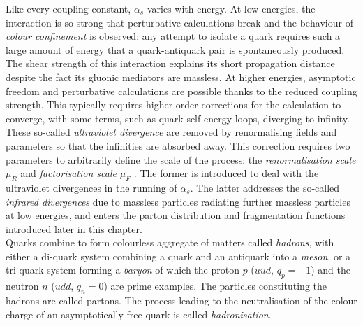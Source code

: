 Like every coupling constant, $\alpha_s$ varies with energy. At low energies, the interaction is so strong that perturbative calculations break and the behaviour of \textit{colour confinement} is observed: any attempt to isolate a quark requires such a large amount of energy that a quark-antiquark pair is spontaneously produced. The shear strength of this interaction explains its short propagation distance despite the fact its gluonic mediators are massless. At higher energies, asymptotic freedom and perturbative calculations are possible thanks to the reduced coupling strength. This typically requires higher-order corrections for the calculation to converge, with some terms, such as quark self-energy loops, diverging to infinity. These so-called \textit{ultraviolet divergence} are removed by renormalising fields and parameters so that the infinities are absorbed away. This correction requires two parameters to arbitrarily define the scale of the process: the \textit{renormalisation scale} $\mu_R$ and \textit{factorisation scale} $\mu_F$ \cite{collins2004factorization}. The former is introduced to deal with the ultraviolet divergences in the running of $\alpha_s$. The latter addresses the so-called \textit{infrared divergences} due to massless particles radiating further massless particles at low energies, and enters the parton distribution and fragmentation functions introduced later in this chapter.\\

Quarks combine to form colourless aggregate of matters called \textit{hadrons}, with either a di-quark system combining a quark and an antiquark into a \textit{meson}, or a tri-quark system forming a \textit{baryon} of which the proton $p$ ($uud$, $q_p = +1$) and the neutron $n$ ($udd$, $q_n = 0$) are prime examples. The particles constituting the hadrons are called partons. The process leading to the neutralisation of the colour charge of an asymptotically free quark is called \textit{hadronisation}.

